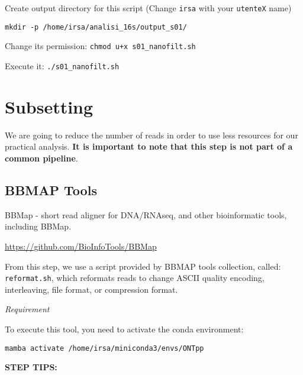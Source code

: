 \documentclass[
]{book}
\begin{document}
Create output directory for this script (Change \texttt{irsa} with your \texttt{utenteX} name)

\begin{verbatim}
mkdir -p /home/irsa/analisi_16s/output_s01/
\end{verbatim}

Change its permission:
\texttt{chmod\ u+x\ s01\_nanofilt.sh}

Execute it:
\texttt{./s01\_nanofilt.sh}

\section{Subsetting}\label{subsetting}

We are going to reduce the number of reads in order to use less resources for our practical analysis. \textbf{It is important to note that this step is not part of a common pipeline}.

\subsection{BBMAP Tools}\label{bbmap-tools}

BBMap - short read aligner for DNA/RNAseq, and other bioinformatic tools, including BBMap.

\url{https://github.com/BioInfoTools/BBMap}

From this step, we use a script provided by BBMAP tools collection, called: \texttt{reformat.sh}, which reformats reads to change ASCII quality encoding, interleaving, file format, or compression format.

\emph{Requirement}

To execute this tool, you need to activate the conda environment:

\texttt{mamba\ activate\ /home/irsa/miniconda3/envs/ONTpp}

\textbf{STEP TIPS:}
\end{document}
